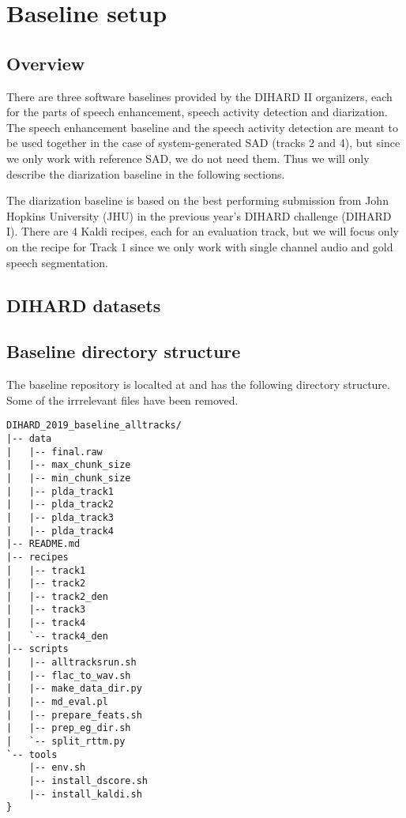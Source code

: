 \chapter{Baseline setup}

\section{Overview}
There are three software baselines provided by the DIHARD II organizers, each for the parts of speech enhancement, speech activity detection and diarization. The speech enhancement baseline and the speech activity detection are meant to be used together in the case of system-generated SAD (tracks 2 and 4), but since we only work with reference SAD, we do not need them. Thus we will only describe the diarization baseline in the following sections.

The diarization baseline is based on the best performing submission \cite{sell2018diarization} from John Hopkins University (JHU) in the previous year's DIHARD challenge (DIHARD I). There are 4 Kaldi recipes, each for an evaluation track, but we will focus only on the recipe for Track 1 since we only work with single channel audio and gold speech segmentation.

\section{DIHARD datasets}


\section{Baseline directory structure}
The baseline repository is localted at  and has the following directory structure. Some of the irrrelevant files have been removed.

\begin{verbatim}
DIHARD_2019_baseline_alltracks/
|-- data
|   |-- final.raw
|   |-- max_chunk_size
|   |-- min_chunk_size
|   |-- plda_track1
|   |-- plda_track2
|   |-- plda_track3
|   |-- plda_track4
|-- README.md
|-- recipes
|   |-- track1
|   |-- track2
|   |-- track2_den
|   |-- track3
|   |-- track4
|   `-- track4_den
|-- scripts
|   |-- alltracksrun.sh
|   |-- flac_to_wav.sh
|   |-- make_data_dir.py
|   |-- md_eval.pl
|   |-- prepare_feats.sh
|   |-- prep_eg_dir.sh
|   `-- split_rttm.py
`-- tools
    |-- env.sh
    |-- install_dscore.sh
    |-- install_kaldi.sh
}
\end{verbatim}

